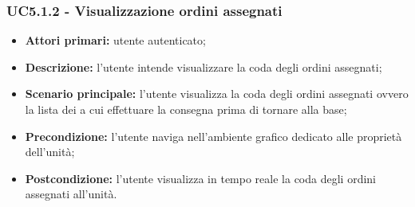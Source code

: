         \subsubsection{UC5.1.2 - Visualizzazione ordini assegnati}
        \begin{itemize}
            \item \textbf{Attori primari:} utente autenticato;
            \item \textbf{Descrizione:} l'utente intende visualizzare la coda degli ordini assegnati;
            \item \textbf{Scenario principale:} l'utente visualizza la coda degli ordini assegnati ovvero la lista dei  a cui effettuare la consegna prima di tornare alla base;
            \item \textbf{Precondizione:} l'utente naviga nell'ambiente grafico dedicato alle proprietà dell'unità;
            \item \textbf{Postcondizione:} l'utente visualizza in tempo reale la coda degli ordini assegnati all'unità.
        \end{itemize}


